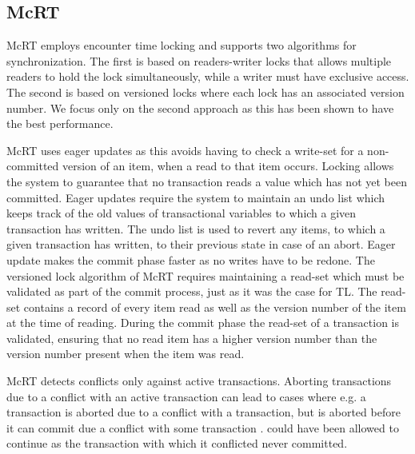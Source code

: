 \subsection{McRT}
\label{sec:stm_impl_mcrt}
McRT employs encounter time locking and supports two algorithms for synchronization\cite[p. 189]{saha2006mcrt}. The first is based on readers-writer locks that allows multiple readers to hold the lock simultaneously, while a writer must have exclusive access\cite[p. 189]{saha2006mcrt}. The second is based on versioned locks where each lock has an associated version number\cite[p. 108]{harris2010transactional}. We focus only on the second approach as this has been shown to have the best performance\cite[p. 190]{saha2006mcrt}. 

McRT uses eager updates as this avoids having to check a write-set for a non-committed version of an item, when a read to that item occurs\cite[p. 109]{harris2010transactional}. Locking allows the system to guarantee that no transaction reads a value which has not yet been committed\cite[p. 108]{harris2010transactional}. Eager updates require the system to maintain an undo list which keeps track of the old values of transactional variables to which a given transaction has written. The undo list is used to revert any items, to which a given transaction has written, to their previous state in case of an abort\cite[p. 189]{saha2006mcrt}. Eager update makes the commit phase faster as no writes have to be redone\cite[p. 190]{saha2006mcrt}. The versioned lock algorithm of McRT requires maintaining a read-set which must be validated as part of the commit process, just as it was the case for TL. The read-set contains a record of every item read as well as the version number of the item at the time of reading. During the commit phase the read-set of a transaction is validated, ensuring that no read item has a higher version number than the version number present when the item was read\cite[p. 190]{saha2006mcrt}.

McRT detects conflicts only against active transactions\cite[p. 189]{saha2006mcrt}. Aborting transactions due to a conflict with an active transaction can lead to cases where e.g. a transaction  is aborted due to a conflict with a  transaction, but  is aborted before it can commit due a conflict with some transaction \cite[p. 2084]{herlihy2011tm}.  could have been allowed to continue as the transaction with which it conflicted never committed. 

